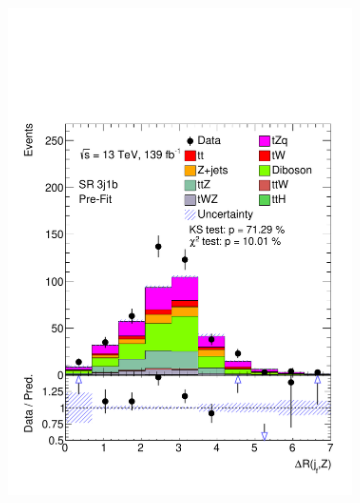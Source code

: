 \begin{figure}
\begin{subfigure}[b]{0.32\linewidth}
    \includegraphics[width=\linewidth]{ubonn-thesis/Chapters/Chapters_06/Figure/Input_distribution/SR_2j1b_dR_jf_Z.pdf} 
  \end{subfigure}
  \begin{subfigure}[b]{0.32\linewidth}
    \centering

\end{subfigure}
\end{figure}
